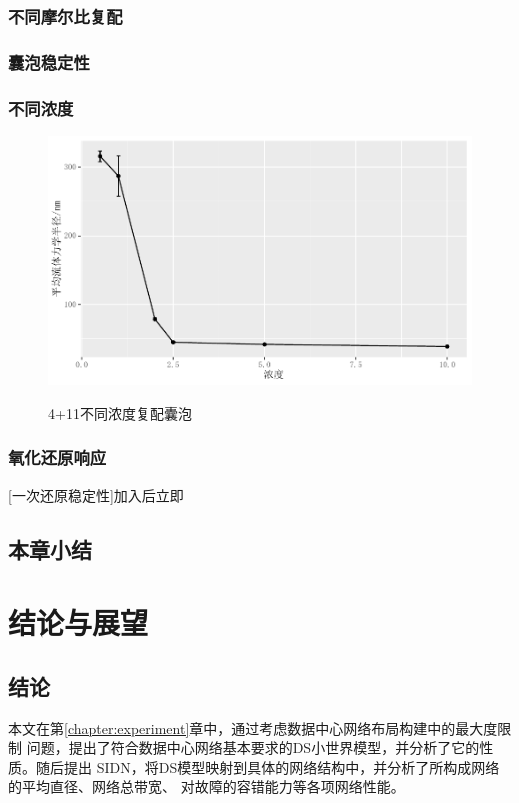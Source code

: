 \documentclass[bachelor,fandolfonts,replaceperiod]{jnuthesis} %
\begin{document}
    \subsection{不同摩尔比复配}
    
    \subsection{囊泡稳定性}
    
    \subsection{不同浓度}
    \begin{figure}[htbp]
        \centering
        \includegraphics[width=0.8\linewidth]{Figure/test.pdf}\\
        \caption{4+11不同浓度复配囊泡}\label{fig:vesicle-concentration-line}
    \end{figure}
    \subsection{氧化还原响应}
    
    
    [一次还原稳定性]加入后立即
    \section{本章小结}

    \chapter{结论与展望}\label{chapter:concludes}
    \section{结论}
    本文在第\ref{chapter:experiment}章中，通过考虑数据中心网络布局构建中的最大度限制
    问题，提出了符合数据中心网络基本要求的DS小世界模型，并分析了它的性质。随后提出
    SIDN，将DS模型映射到具体的网络结构中，并分析了所构成网络的平均直径、网络总带宽、
    对故障的容错能力等各项网络性能。
    
\end{document}
